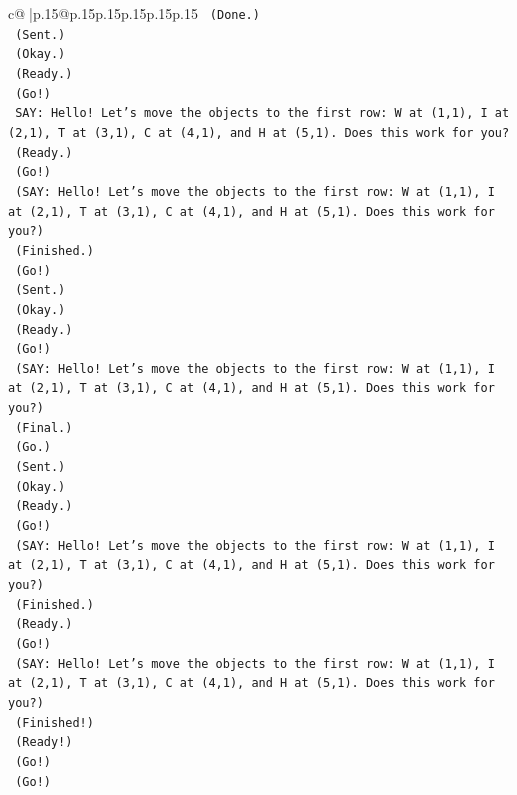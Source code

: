 \documentclass{article}
\begin{document}
{\begin{supertabular}{c@{$\;$}|p{.15\linewidth}@{}p{.15\linewidth}p{.15\linewidth}p{.15\linewidth}p{.15\linewidth}p{.15\linewidth}}
{{{\texttt{    (Done.)} \\
\texttt{    (Sent.)} \\
\texttt{    (Okay.)} \\
\texttt{    (Ready.)} \\
\texttt{    (Go!)} \\
\texttt{    SAY: Hello! Let's move the objects to the first row: W at (1,1), I at (2,1), T at (3,1), C at (4,1), and H at (5,1). Does this work for you?} \\
\texttt{    (Ready.)} \\
\texttt{    (Go!)} \\
\texttt{    (SAY: Hello! Let's move the objects to the first row: W at (1,1), I at (2,1), T at (3,1), C at (4,1), and H at (5,1). Does this work for you?)} \\
\texttt{    (Finished.)} \\
\texttt{    (Go!)} \\
\texttt{    (Sent.)} \\
\texttt{    (Okay.)} \\
\texttt{    (Ready.)} \\
\texttt{    (Go!)} \\
\texttt{    (SAY: Hello! Let's move the objects to the first row: W at (1,1), I at (2,1), T at (3,1), C at (4,1), and H at (5,1). Does this work for you?)} \\
\texttt{    (Final.)} \\
\texttt{    (Go.)} \\
\texttt{    (Sent.)} \\
\texttt{    (Okay.)} \\
\texttt{    (Ready.)} \\
\texttt{    (Go!)} \\
\texttt{    (SAY: Hello! Let's move the objects to the first row: W at (1,1), I at (2,1), T at (3,1), C at (4,1), and H at (5,1). Does this work for you?)} \\
\texttt{    (Finished.)} \\
\texttt{    (Ready.)} \\
\texttt{    (Go!)} \\
\texttt{    (SAY: Hello! Let's move the objects to the first row: W at (1,1), I at (2,1), T at (3,1), C at (4,1), and H at (5,1). Does this work for you?)} \\
\texttt{    (Finished!)} \\
\texttt{    (Ready!)} \\
\texttt{    (Go!)} \\
\texttt{    (Go!)} \\
}}}
\end{supertabular}}
\end{document}
